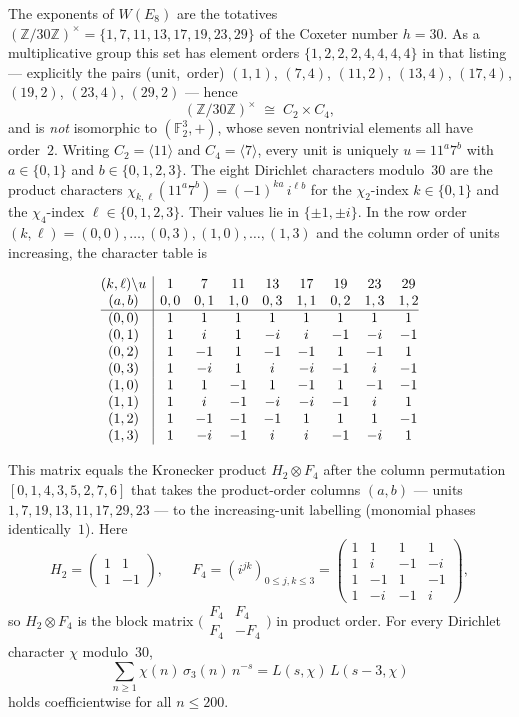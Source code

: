 \documentclass[11pt,a4paper]{article}
\theoremstyle{remark}
\newcommand{\F}{\mathbb F}
\newcommand{\Z}{\mathbb Z}
\begin{document}
The exponents of $W(E_8)$ are the totatives
$(\Z/30\Z)^{\times}=\{1,7,11,13,17,19,23,29\}$ of the Coxeter number
$h=30$.  As a multiplicative group this set has element orders
$\{1,2,2,2,4,4,4,4\}$ in that listing --- explicitly the pairs
(unit,~order)
$(1,1)$, $(7,4)$, $(11,2)$, $(13,4)$, $(17,4)$, $(19,2)$, $(23,4)$,
$(29,2)$ --- hence
\[
(\Z/30\Z)^{\times}\;\cong\;C_2\times C_4,
\]
and is \emph{not} isomorphic to $(\F_2^3,+)$, whose seven nontrivial
elements all have order~$2$.  Writing $C_2=\langle 11\rangle$ and
$C_4=\langle 7\rangle$, every unit is uniquely $u=11^a7^b$ with
$a\in\{0,1\}$ and $b\in\{0,1,2,3\}$.  The eight Dirichlet characters
modulo~$30$ are the product characters
$\chi_{k,\ell}(11^a7^b)=(-1)^{ka}\,i^{\ell b}$ for the
$\chi_2$-index $k\in\{0,1\}$ and the $\chi_4$-index
$\ell\in\{0,1,2,3\}$.  Their values lie in $\{\pm1,\pm i\}$.  In the
row order $(k,\ell)=(0,0),\dots,(0,3),(1,0),\dots,(1,3)$ and the
column order of units increasing, the character table is
\begin{center}
\small
\setlength{\arraycolsep}{3.6pt}
\[
\begin{array}{@{}c|cccccccc@{}}
(k,\ell)\backslash u & 1 & 7 & 11 & 13 & 17 & 19 & 23 & 29 \\
(a,b) & 0,0 & 0,1 & 1,0 & 0,3 & 1,1 & 0,2 & 1,3 & 1,2 \\
\hline
(0,0) & 1 & 1 & 1 & 1 & 1 & 1 & 1 & 1 \\
(0,1) & 1 & i & 1 & -i & i & -1 & -i & -1 \\
(0,2) & 1 & -1 & 1 & -1 & -1 & 1 & -1 & 1 \\
(0,3) & 1 & -i & 1 & i & -i & -1 & i & -1 \\
(1,0) & 1 & 1 & -1 & 1 & -1 & 1 & -1 & -1 \\
(1,1) & 1 & i & -1 & -i & -i & -1 & i & 1 \\
(1,2) & 1 & -1 & -1 & -1 & 1 & 1 & 1 & -1 \\
(1,3) & 1 & -i & -1 & i & i & -1 & -i & 1
\end{array}
\]
\end{center}
This matrix equals the Kronecker product $H_2\otimes F_4$ after the
column permutation $[0,1,4,3,5,2,7,6]$ that takes the product-order
columns $(a,b)$ --- units $1,7,19,13,11,17,29,23$ --- to the
increasing-unit labelling (monomial phases identically~$1$).  Here
\[
H_2=\begin{pmatrix}1&1\\1&-1\end{pmatrix},\qquad
F_4=(i^{jk})_{0\le j,k\le 3}
=\begin{pmatrix}
1&1&1&1\\
1&i&-1&-i\\
1&-1&1&-1\\
1&-i&-1&i
\end{pmatrix},
\]
so $H_2\otimes F_4$ is the block matrix
$\bigl(\begin{smallmatrix}F_4&F_4\\ F_4&-F_4\end{smallmatrix}\bigr)$
in product order.  For every Dirichlet character $\chi$ modulo~$30$,
\[
\sum_{n\ge1}\chi(n)\,\sigma_3(n)\,n^{-s}
=L(s,\chi)\,L(s-3,\chi)
\]
holds coefficientwise for all $n\le200$.
\end{document}
